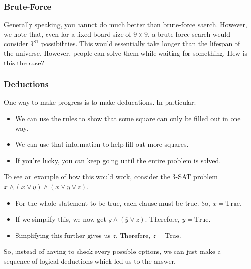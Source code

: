 \documentclass[letterpaper]{article}
\begin{document}
\subsubsection{Brute-Force}
Generally speaking, you cannot do much better than brute-force saerch. However, we note that, even for a fixed board size of $9 \times 9$, a brute-force search would consider $9^{81}$ possibilities. This would essentially take longer than the lifespan of the universe. However, people can solve them while waiting for something. How is this the case? 

\subsubsection{Deductions}
One way to make progress is to make deducations. In particular: 
\begin{itemize}
    \item We can use the rules to show that some square can only be filled out in one way. 
    \item We can use that information to help fill out more squares. 
    \item If you're lucky, you can keep going until the entire problem is solved. 
\end{itemize}
To see an example of how this would work, consider the 3-SAT problem $x \land (\overline{x} \lor y) \land (\overline{x} \lor \overline{y} \lor z)$. 
\begin{itemize}
    \item For the whole statement to be true, each clause must be true. So, $x = \text{True}$.
    \item If we simplify this, we now get $y \land (\overline{y} \lor z)$. Therefore, $y = \text{True}$. 
    \item Simplifying this further gives us $z$. Therefore, $z = \text{True}$. 
\end{itemize}
So, instead of having to check every possible options, we can just make a sequence of logical deductions which led us to the answer. 
\end{document}
